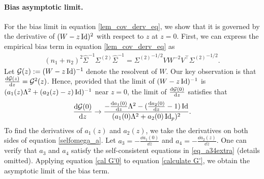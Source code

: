 \paragraph{Bias asymptotic limit.}
 For the bias limit in equation \eqref{lem_cov_derv_eq}, we show that it is governed by the derivative of $(W - z\operatorname{Id})^2$ with respect to $z$ at $z = 0$.
First, we can express the empirical bias term in equation \eqref{lem_cov_derv_eq} as %
\begin{align}\label{calculate G'}
	(n_1 + n_2)^2 \hat{\Sigma}^{-1}\Sigma^{(2)}\hat{\Sigma}^{-1} = {\Sigma^{(2)}}^{-1/2} V W^{-2} V^{\top} {\Sigma^{(2)}}^{-1/2}.
\end{align}
Let $\mathcal G(z):=(W-z\operatorname{Id} )^{-1}$ denote the resolvent of $W$.
Our key observation is that $\frac{\mathrm{d}{\mathcal G(z)}}{\mathrm{d} z} =  \mathcal G^2(z)$.
Hence, provided that the limit of $(W - z\operatorname{Id})^{-1}$ is $(a_1(z) \Lambda^2 + (a_2(z) - z) \operatorname{Id})^{-1}$ near $z = 0$, the limit of $\frac{\mathrm{d}{\mathcal G(0)}}{\mathrm{d} z}$ satisfies that
\begin{align}\label{cal G'0}
	\frac{\mathrm{d} \mathcal G(0)}{\mathrm{d} z} \to \frac{-\frac{\mathrm{d} a_1(0)}{\mathrm{d} z}\Lambda^2 - (\frac{\mathrm{d} a_2(0)}{\mathrm{d} z} - 1)\operatorname{Id}}{(a_{1}(0)\Lambda^2 + a_{2}(0)\operatorname{Id}_p)^2}.
\end{align}
To find the derivatives of $a_1(z)$ and $a_2(z)$, we take the derivatives on both sides of equation \eqref{selfomega_a}.
Let $a_3 = - \frac{\dd a_1(0)}{\dd z}$ and $a_4 = - \frac{\dd a_2(z)}{\dd z}$.
One can verify that $a_3$ and $a_4$ satisfy the self-consistent equations in \eqref{eq_a34extra} (details omitted).
Applying equation \eqref{cal G'0} to equation \eqref{calculate G'}, we obtain the asymptotic limit of the bias term.

